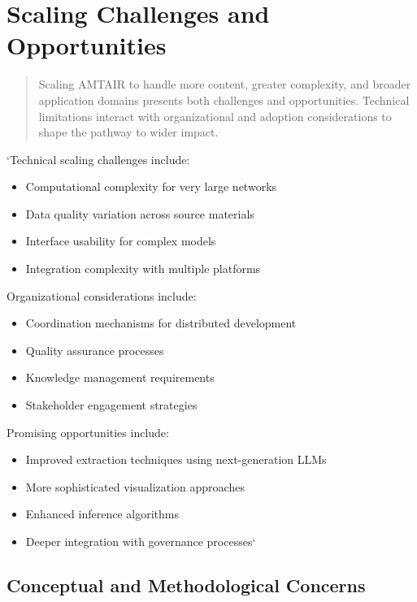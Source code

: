 \documentclass[
  11pt,
  letterpaper,
]{book}
\providecommand{\tightlist}{%
  \setlength{\itemsep}{0pt}\setlength{\parskip}{0pt}}
\begin{document}
\section{Scaling Challenges and
Opportunities}\label{sec-scaling-challenges}

\begin{quote}
Scaling AMTAIR to handle more content, greater complexity, and broader
application domains presents both challenges and opportunities.
Technical limitations interact with organizational and adoption
considerations to shape the pathway to wider impact.
\end{quote}

`Technical scaling challenges include:

\begin{itemize}
\tightlist
\item
  Computational complexity for very large networks
\item
  Data quality variation across source materials
\item
  Interface usability for complex models
\item
  Integration complexity with multiple platforms
\end{itemize}

Organizational considerations include:

\begin{itemize}
\tightlist
\item
  Coordination mechanisms for distributed development
\item
  Quality assurance processes
\item
  Knowledge management requirements
\item
  Stakeholder engagement strategies
\end{itemize}

Promising opportunities include:

\begin{itemize}
\tightlist
\item
  Improved extraction techniques using next-generation LLMs
\item
  More sophisticated visualization approaches
\item
  Enhanced inference algorithms
\item
  Deeper integration with governance processes`
\end{itemize}

\subsection{Conceptual and Methodological
Concerns}\label{sec-conceptual-concerns2}
\end{document}
